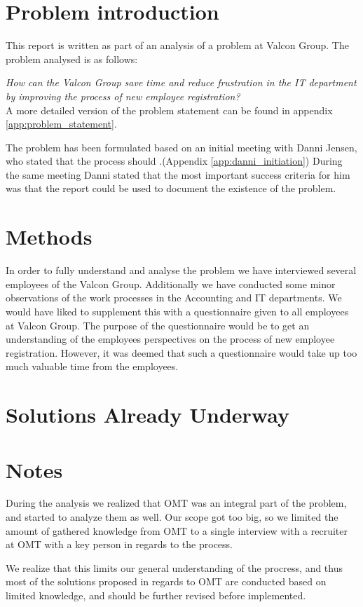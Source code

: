 \section{Problem introduction}
This report is written as part of an analysis of a problem at Valcon Group.
The problem analysed is as follows:

\emph{How can the Valcon Group save time and reduce frustration in the IT department by improving the process of new employee registration?}
\\
A more detailed version of the problem statement can be found in appendix \ref{app:problem_statement}.

The problem has been formulated based on an initial meeting with Danni Jensen, who stated that the process should .(Appendix \ref{app:danni_initiation})
During the same meeting Danni stated that the most important success criteria for him was that the report could be used to document the existence of the problem.

\section{Methods}
In order to fully understand and analyse the problem we have interviewed several employees of the Valcon Group.
Additionally we have conducted some minor observations of the work processes in the Accounting and IT departments.
We would have liked to supplement this with a questionnaire given to all employees at Valcon Group.
The purpose of the questionnaire would be to get an understanding of the employees perspectives on the process of new employee registration.
However, it was deemed that such a questionnaire would take up too much valuable time from the employees.
\section{Solutions Already Underway}


\section{Notes}
During the analysis we realized that OMT was an integral part of the problem, and started to analyze them as well.
Our scope got too big, so we limited the amount of gathered knowledge from OMT to a single interview with a recruiter at OMT with a key person in regards to the process. 

We realize that this limits our general understanding of the procress, and thus most of the solutions proposed in regards to OMT are conducted based on limited knowledge, and should be further revised before implemented. 
